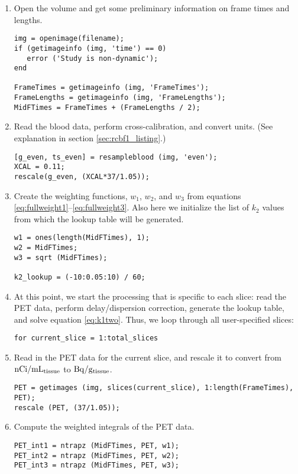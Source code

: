 \documentclass[12pt]{article}
\begin{document}
\begin{enumerate}
\item Open the volume and get some preliminary information on frame
  times and lengths.
  \begin{verbatim}
img = openimage(filename);
if (getimageinfo (img, 'time') == 0)
   error ('Study is non-dynamic');
end

FrameTimes = getimageinfo (img, 'FrameTimes');
FrameLengths = getimageinfo (img, 'FrameLengths');
MidFTimes = FrameTimes + (FrameLengths / 2);
  \end{verbatim}

\item Read the blood data, perform cross-calibration, and convert
  units.  (See explanation in section \ref{sec:rcbf1_listing}.)
  \begin{verbatim}
[g_even, ts_even] = resampleblood (img, 'even');
XCAL = 0.11;
rescale(g_even, (XCAL*37/1.05));
  \end{verbatim}

\item Create the weighting functions, $w_1$, $w_2$, and $w_3$ from
  equations \ref{eq:fullweight1}--\ref{eq:fullweight3}.  Also here we
  initialize the list of $k_2$ values from which the lookup table will
  be generated.

  \begin{verbatim}
w1 = ones(length(MidFTimes), 1);
w2 = MidFTimes;
w3 = sqrt (MidFTimes);

k2_lookup = (-10:0.05:10) / 60;
  \end{verbatim}


\item At this point, we start the processing that is specific to each
  slice: read the PET data, perform delay/dispersion correction,
  generate the lookup table, and solve equation \ref{eq:k1two}.  Thus,
  we loop through all user-specified slices:
  \begin{verbatim}
for current_slice = 1:total_slices
  \end{verbatim}

\item Read in the PET data for the current slice, and rescale it
  to convert from ${\rm nCi/mL_{tissue}}$ to ${\rm Bq/g_{tissue}}$.
  \begin{verbatim}
PET = getimages (img, slices(current_slice), 1:length(FrameTimes), PET);
rescale (PET, (37/1.05));
  \end{verbatim}

\item Compute the weighted integrals of the PET data.
  \begin{verbatim}
PET_int1 = ntrapz (MidFTimes, PET, w1);
PET_int2 = ntrapz (MidFTimes, PET, w2);
PET_int3 = ntrapz (MidFTimes, PET, w3);
  \end{verbatim}


\end{enumerate}
\end{document}
